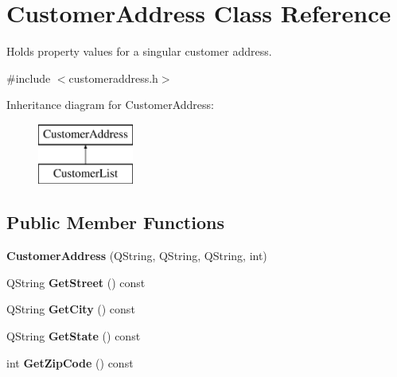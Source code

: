\hypertarget{class_customer_address}{}\section{Customer\+Address Class Reference}
\label{class_customer_address}


Holds property values for a singular customer address.  




{\ttfamily \#include $<$customeraddress.\+h$>$}

Inheritance diagram for Customer\+Address\+:\begin{figure}[H]
\begin{center}
\leavevmode
\includegraphics[height=2.000000cm]{class_customer_address}
\end{center}
\end{figure}
\subsection*{Public Member Functions}
\begin{DoxyCompactItemize}
\item 
\mbox{\label{class_customer_address_a42b4b2cf860db0f31626f97bf55ca1a3}} 
{\bfseries Customer\+Address} (Q\+String, Q\+String, Q\+String, int)
\item 
\mbox{\label{class_customer_address_a75d3fb31489664f2f524df57dce4b987}} 
Q\+String {\bfseries Get\+Street} () const
\item 
\mbox{\label{class_customer_address_ac7ea47e415c0c51577fa2ae4f8780312}} 
Q\+String {\bfseries Get\+City} () const
\item 
\mbox{\label{class_customer_address_aef0f7c440785bc97abbf044c28336bce}} 
Q\+String {\bfseries Get\+State} () const
\item 
\mbox{\label{class_customer_address_ac745328627d7edc3363c7209ecc5f7fb}} 
int {\bfseries Get\+Zip\+Code} () const
\end{DoxyCompactItemize}



